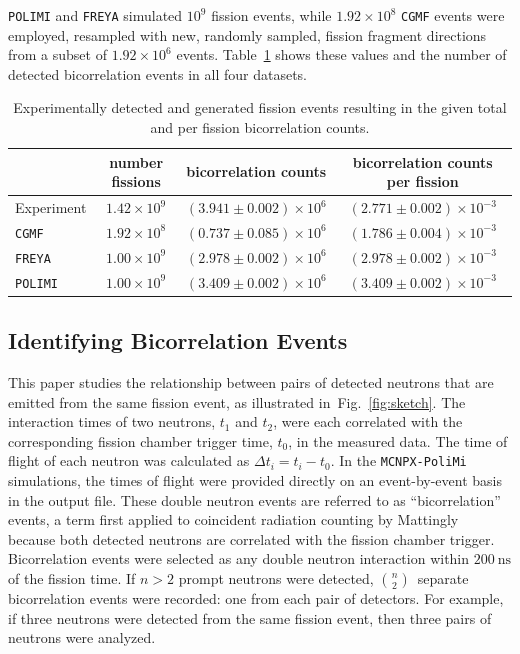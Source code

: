 \documentclass[preprint,12pt]{elsarticle}
\newcommand{\fig}[1]     {Fig.~\ref{#1}}
\newcommand{\tab}[1]     {Table~\ref{#1}}
\newcommand{\mcnpxpolimi}     {\texttt{MCNPX-PoliMi}\xspace}
\newcommand{\cgmf}            {\texttt{CGMF}\xspace}
\newcommand{\freya}           {\texttt{FREYA}\xspace}
\newcommand{\polimi}          {\texttt{POLIMI}\xspace}
\newcommand{\genunit}[2]{\ensuremath{#1~\text{#2}}\xspace}
\newcommand{\ns}[1]{\genunit{#1}{ns}}
\begin{document}
\polimi and \freya simulated $10^9$ fission events, while $1.92\times10^8$ \cgmf events were employed, resampled with new, randomly sampled, fission fragment directions from a subset of $1.92\times10^6$ events. \tab{tab:counts} shows these values and the number of detected bicorrelation events in all four datasets.

\begin{table}[ht]
	\centering
	\caption{Experimentally detected and generated fission events resulting in the given total and per fission bicorrelation counts.}
	\label{tab:counts}
	\begin{tabular}{l|c|c|c}
		&number fissions& bicorrelation counts & bicorrelation counts per fission \\
		\hline
		Experiment   & $1.42\times10^9$ & $(3.941\pm0.002)\times10^6$ & $(2.771\pm0.002) \times10^{-3}$ \\
		\cgmf         & $1.92\times10^8$ & $(0.737\pm0.085)\times10^6$ & $(1.786\pm0.004) \times10^{-3}$\\
		\freya        & $1.00\times10^9$ & $(2.978\pm0.002)\times10^6$ & $(2.978\pm0.002) \times10^{-3}$\\
		\polimi       & $1.00\times10^9$ & $(3.409\pm0.002)\times10^6$ & $(3.409\pm0.002) \times10^{-3}$       
	\end{tabular}
\end{table}

\subsection{Identifying Bicorrelation Events}\label{sec:bicorr_events}

This paper studies the relationship between pairs of detected neutrons that are emitted from the same fission event, as illustrated in~\fig{fig:sketch}. The interaction times of two neutrons, $t_1$ and $t_2$, were each correlated with the corresponding fission chamber trigger time, $t_0$, in the measured data. The time of flight of each neutron was calculated as $\Delta t_i = t_i-t_0$. In the \mcnpxpolimi simulations, the times of flight were provided directly on an event-by-event basis in the output file. These double neutron events are referred to as ``bicorrelation'' events, a term first applied to coincident radiation counting by Mattingly~\cite{Mattingly1998} because both detected neutrons are correlated with the fission chamber trigger. Bicorrelation events were selected as any double neutron interaction within \ns{200} of the fission time. If $n>2$ prompt neutrons were detected, $n\choose2$~separate bicorrelation events were recorded: one from each pair of detectors. For example, if three neutrons were detected from the same fission event, then three pairs of neutrons were analyzed.
\end{document}
